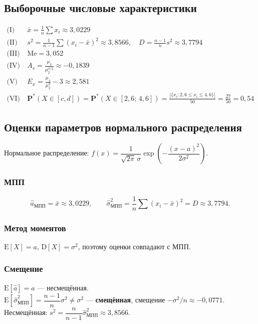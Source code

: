 \documentclass[12pt,a4paper]{article}
\newcommand{\ahat}{\hat{a}}
\newcommand{\shat}{\hat{\sigma}^2}
\newcommand{\xbar}{\bar{x}}
\begin{document}
	\subsection{Выборочные числовые характеристики}
	
	\begin{align}
		\text{(I)}\ & \xbar = \frac{1}{n}\sum x_i \approx 3{,}0229 \\[4pt]
		\text{(II)}\ & s^2 = \frac{1}{n-1}\sum(x_i-\xbar)^2 \approx 3{,}8566,
		\quad D = \frac{n-1}{n}s^2 \approx 3{,}7794 \\[4pt]
		\text{(III)}\ & \mathrm{Me} = 3{,}052 \\[4pt]
		\text{(IV)}\ & A_s = \frac{\mu_3}{\mu_2^{3/2}} \approx -0{,}1839 \\[4pt]
		\text{(V)}\ & E_x = \frac{\mu_4}{\mu_2^2} - 3 \approx 2{,}581 \\[4pt]
		\text{(VI)}\ & \mathbf{P}^*(X \in [c,d]) = \mathbf{P}^*(X \in [2{,}6;\,4{,}6])
		= \frac{|\{x_i : 2{,}6 \le x_i \le 4{,}6\}|}{50} = \frac{27}{50} = 0{,}54
	\end{align}
	
	\subsection{Оценки параметров нормального распределения}
	
	Нормальное распределение: $f(x) = \dfrac{1}{\sqrt{2\pi}\,\sigma}
	\exp\!\left(-\dfrac{(x-a)^2}{2\sigma^2}\right)$.
	
	\subsubsection*{МПП}
	\[
	\ahat_{\text{МПП}} = \xbar \approx 3{,}0229, \qquad
	\shat_{\text{МПП}} = \frac{1}{n}\sum(x_i-\xbar)^2 = D \approx 3{,}7794.
	\]
	
	\subsubsection*{Метод моментов}
	$\mathrm{E}[X]=a$, $\mathrm{D}[X]=\sigma^2$, поэтому оценки совпадают с МПП.
	
	\subsubsection*{Смещение}
	$\mathrm{E}[\ahat] = a$ --- несмещённая.\\
	$\mathrm{E}[\shat_{\text{МПП}}] = \dfrac{n-1}{n}\sigma^2 \ne \sigma^2$ ---
	\textbf{смещённая}, смещение $-\sigma^2/n \approx -0{,}0771$.\\
	Несмещённая: $s^2 = \dfrac{n}{n-1}\shat_{\text{МПП}} \approx 3{,}8566$.
	
\end{document}
